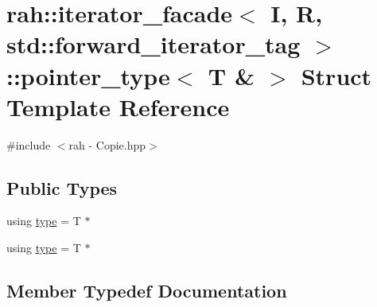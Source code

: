 \hypertarget{structrah_1_1iterator__facade_3_01_i_00_01_r_00_01std_1_1forward__iterator__tag_01_4_1_1pointer__type_3_01_t_01_6_01_4}{}\section{rah\+::iterator\+\_\+facade$<$ I, R, std\+::forward\+\_\+iterator\+\_\+tag $>$\+::pointer\+\_\+type$<$ T \& $>$ Struct Template Reference}
\label{structrah_1_1iterator__facade_3_01_i_00_01_r_00_01std_1_1forward__iterator__tag_01_4_1_1pointer__type_3_01_t_01_6_01_4}


{\ttfamily \#include $<$rah -\/ Copie.\+hpp$>$}

\subsection*{Public Types}
\begin{DoxyCompactItemize}
\item 
using \mbox{\hyperlink{structrah_1_1iterator__facade_3_01_i_00_01_r_00_01std_1_1forward__iterator__tag_01_4_1_1pointer__type_3_01_t_01_6_01_4_ae2819aa7fbf4febbc6f3cb0034745653}{type}} = T $\ast$
\item 
using \mbox{\hyperlink{structrah_1_1iterator__facade_3_01_i_00_01_r_00_01std_1_1forward__iterator__tag_01_4_1_1pointer__type_3_01_t_01_6_01_4_ae2819aa7fbf4febbc6f3cb0034745653}{type}} = T $\ast$
\end{DoxyCompactItemize}


\subsection{Member Typedef Documentation}
\mbox{\label{structrah_1_1iterator__facade_3_01_i_00_01_r_00_01std_1_1forward__iterator__tag_01_4_1_1pointer__type_3_01_t_01_6_01_4_ae2819aa7fbf4febbc6f3cb0034745653}} 
